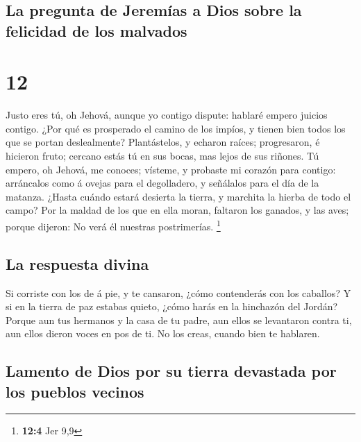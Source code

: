\hypertarget{la-pregunta-de-jeremuxedas-a-dios-sobre-la-felicidad-de-los-malvados}{%
\subsection{La pregunta de Jeremías a Dios sobre la felicidad de los
malvados}\label{la-pregunta-de-jeremuxedas-a-dios-sobre-la-felicidad-de-los-malvados}}

\hypertarget{section-11}{%
\section{12}\label{section-11}}

 Justo eres tú, oh Jehová, aunque yo contigo dispute:
hablaré empero juicios contigo. ¿Por qué es prosperado el camino de los
impíos, y tienen bien todos los que se portan deslealmente?
 Plantástelos, y echaron raíces; progresaron, é hicieron
fruto; cercano estás tú en sus bocas, mas lejos de sus riñones.
 Tú empero, oh Jehová, me conoces; vísteme, y probaste mi
corazón para contigo: arráncalos como á ovejas para el degolladero, y
señálalos para el día de la matanza.  ¿Hasta cuándo estará
desierta la tierra, y marchita la hierba de todo el campo? Por la maldad
de los que en ella moran, faltaron los ganados, y las aves; porque
dijeron: No verá él nuestras postrimerías. \footnote{\textbf{12:4} Jer
  9,9}

\hypertarget{la-respuesta-divina}{%
\subsection{La respuesta divina}\label{la-respuesta-divina}}

 Si corriste con los de á pie, y te cansaron, ¿cómo
contenderás con los caballos? Y si en la tierra de paz estabas quieto,
¿cómo harás en la hinchazón del Jordán?  Porque aun tus
hermanos y la casa de tu padre, aun ellos se levantaron contra ti, aun
ellos dieron voces en pos de ti. No los creas, cuando bien te hablaren.

\hypertarget{lamento-de-dios-por-su-tierra-devastada-por-los-pueblos-vecinos}{%
\subsection{Lamento de Dios por su tierra devastada por los pueblos
vecinos}\label{lamento-de-dios-por-su-tierra-devastada-por-los-pueblos-vecinos}}

